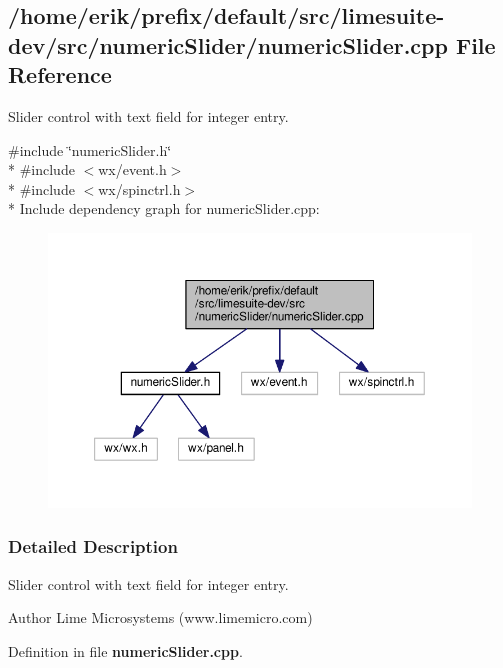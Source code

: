 \subsection{/home/erik/prefix/default/src/limesuite-\/dev/src/numeric\+Slider/numeric\+Slider.cpp File Reference}
\label{numericSlider_8cpp}


Slider control with text field for integer entry.  


{\ttfamily \#include \char`\"{}numeric\+Slider.\+h\char`\"{}}\\*
{\ttfamily \#include $<$wx/event.\+h$>$}\\*
{\ttfamily \#include $<$wx/spinctrl.\+h$>$}\\*
Include dependency graph for numeric\+Slider.\+cpp\+:
\nopagebreak
\begin{figure}[H]
\begin{center}
\leavevmode
\includegraphics[width=350pt]{d4/ddd/numericSlider_8cpp__incl}
\end{center}
\end{figure}


\subsubsection{Detailed Description}
Slider control with text field for integer entry. 

\begin{DoxyAuthor}{Author}
Lime Microsystems (www.\+limemicro.\+com) 
\end{DoxyAuthor}


Definition in file {\bf numeric\+Slider.\+cpp}.

